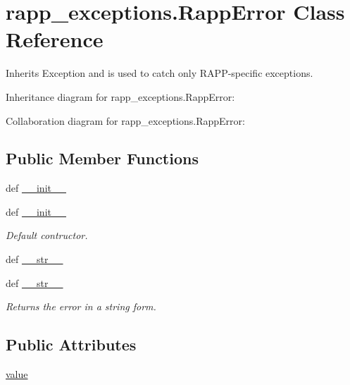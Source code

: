 \hypertarget{classrapp__exceptions_1_1RappError}{\section{rapp\-\_\-exceptions.\-Rapp\-Error Class Reference}
\label{classrapp__exceptions_1_1RappError}
}


Inherits Exception and is used to catch only R\-A\-P\-P-\/specific exceptions.  




Inheritance diagram for rapp\-\_\-exceptions.\-Rapp\-Error\-:


Collaboration diagram for rapp\-\_\-exceptions.\-Rapp\-Error\-:
\subsection*{Public Member Functions}
\begin{DoxyCompactItemize}
\item 
def \hyperlink{classrapp__exceptions_1_1RappError_a90a9797c509de106b6726f50866a1aaa}{\-\_\-\-\_\-init\-\_\-\-\_\-}
\item 
def \hyperlink{classrapp__exceptions_1_1RappError_a90a9797c509de106b6726f50866a1aaa}{\-\_\-\-\_\-init\-\_\-\-\_\-}
\begin{DoxyCompactList}\small\item\em Default contructor. \end{DoxyCompactList}\item 
def \hyperlink{classrapp__exceptions_1_1RappError_aa91e207de1a5fba4ebaf1d4acb0d5951}{\-\_\-\-\_\-str\-\_\-\-\_\-}
\item 
def \hyperlink{classrapp__exceptions_1_1RappError_aa91e207de1a5fba4ebaf1d4acb0d5951}{\-\_\-\-\_\-str\-\_\-\-\_\-}
\begin{DoxyCompactList}\small\item\em Returns the error in a string form. \end{DoxyCompactList}\end{DoxyCompactItemize}
\subsection*{Public Attributes}
\begin{DoxyCompactItemize}
\item 
\hyperlink{classrapp__exceptions_1_1RappError_a4013bcf7e5d7231460c7715a6af02eef}{value}
\end{DoxyCompactItemize}


